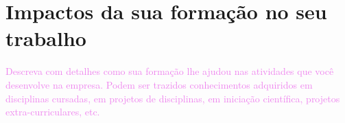 \section{Impactos da sua formação no seu trabalho}
\label{sec:impactos}

\textcolor{violet}{Descreva com detalhes como sua formação lhe ajudou nas atividades que você desenvolve na empresa. Podem ser trazidos conhecimentos adquiridos em disciplinas cursadas, em projetos de disciplinas, em iniciação científica, projetos extra-curriculares, etc.}